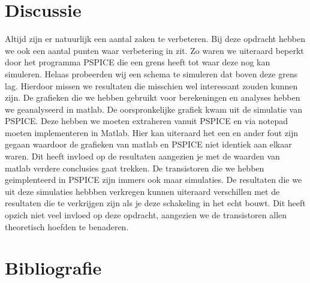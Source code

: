 \documentclass{scrartcl}  %
\begin{document}
\section{Discussie}
Altijd zijn er natuurlijk een aantal zaken te verbeteren. Bij deze opdracht hebben we ook een aantal punten waar verbetering in zit. Zo waren we uiteraard beperkt door het programma PSPICE die een grens heeft tot waar deze nog kan simuleren. Helaas probeerden wij een schema te simuleren dat boven deze grens lag. Hierdoor missen we resultaten die misschien wel interessant zouden kunnen zijn. 
De grafieken die we hebben gebruikt voor berekeningen en analyses hebben we geanalyseerd in matlab. De oorspronkelijke grafiek kwam uit de simulatie van PSPICE. Deze hebben we moeten extraheren vanuit PSPICE en via notepad moeten implementeren in Matlab. Hier kan uiteraard het een en ander fout zijn gegaan waardoor de grafieken van matlab en PSPICE niet identiek aan elkaar waren. Dit heeft invloed op de resultaten aangezien je met de waarden van matlab verdere conclusies gaat trekken. 
De transistoren die we hebben geimplenteerd in PSPICE zijn immers ook maar simulaties. De resultaten die we uit deze simulaties hebbben verkregen kunnen uiteraard verschillen met de resultaten die te verkrijgen zijn als je deze schakeling in het echt bouwt. Dit heeft opzich niet veel invloed op deze opdracht, aangezien we de transistoren allen theoretisch hoefden te benaderen. 

\newpage
\section{Bibliografie}
\printbibliography
\end{document}

